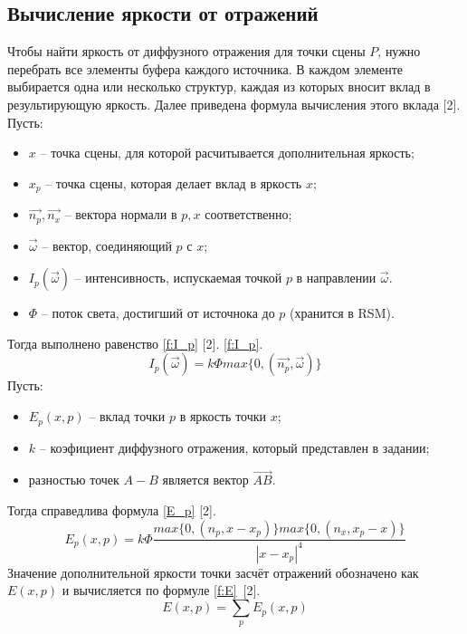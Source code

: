 {{        \subsection{Вычисление яркости от отражений} {
            Чтобы найти яркость от диффузного отражения для точки сцены $P$,
            нужно перебрать все элементы буфера каждого источника.
            В каждом элементе выбирается одна или несколько структур,
            каждая из которых вносит вклад в результирующую яркость.
            Далее приведена формула вычисления этого вклада [2]. \\
            Пусть:
            \begin{itemize}
                \item $x$ -- точка сцены, для которой расчитывается дополнительная яркость;
                \item $x_p$ -- точка сцены, которая делает вклад в яркость $x$;
                \item $\vec{n_p}, \vec{n_x}$ -- вектора нормали в $p, x$ соответственно;
                \item $\vec{\omega}$ -- вектор, соединяющий $p$ с $x$;
                \item $I_p(\vec{\omega})$ -- интенсивность, испускаемая точкой $p$ в
                направлении $\vec{\omega}$.
                \item $\Phi$ -- поток света, достигший от источнока до $p$ (хранится в RSM).
            \end{itemize}
            Тогда выполнено равенство \ref{f:I_p} [2].
            \ref{f:I_p}.
            \begin{equation}
                \label{f:I_p}
                I_p(\vec{\omega}) = k\Phi max\{0, (\vec{n_p}, \vec{\omega})\}
            \end{equation}
            Пусть:
            \begin{itemize}
                \item $E_p(x, p)$ -- вклад точки $p$ в яркость точки $x$;
                \item
                    $k$ -- коэфициент диффузного отражения,
                    который представлен в задании;
                \item разностью точек $A - B$ является вектор $\vec{AB}$.
            \end{itemize}
            Тогда справедлива формула \ref{E_p} [2].
            \begin{equation}
                \label{f:E_p}
                E_p(x, p) = k\Phi\frac{ max\{0, (n_p, x - x_p)\}
                max\{0, (n_x, x_p - x)\} }
                {|x - x_p|^4}
            \end{equation}
            Значение дополнительной яркости точки засчёт отражений
            обозначено как $E(x, p)$ и вычисляется по формуле \ref{f:E}~[2].
            \begin{equation}
                \label{f:E}
                E(x, p) = \sum_p E_p(x, p)
            \end{equation}
        }
}}
